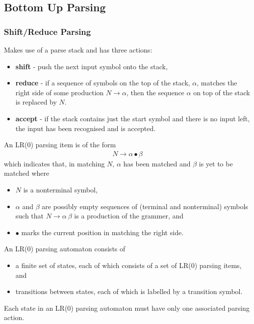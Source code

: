 \subsection{Bottom Up Parsing}

\subsubsection{Shift/Reduce Parsing}
Makes use of a parse stack and has three actions:
\begin{itemize}
    \item \textbf{shift} - push the next input symbol onto the stack,
    \item \textbf{reduce} - if a sequence of symbols on the top of the stack, $\alpha$, 
    matches the right side of some production $N \rightarrow \alpha$, then the sequence 
    $\alpha$ on top of the stack is replaced by $N$.
    \item \textbf{accept} - if the stack contains just the start symbol and there is no
    input left, the input has been recognised and is accepted.
\end{itemize}

An LR(0) parsing item is of the form
\begin{align*}
    N \rightarrow \alpha \bullet \beta
\end{align*}
which indicates that, in matching $N$, $\alpha$ has been matched and $\beta$ is yet to 
be matched where
\begin{itemize}
    \item $N$ is a nonterminal symbol,
    \item $\alpha$ and $\beta$ are possibly empty sequences of (terminal and nonterminal) 
    symbols such that $N \rightarrow \alpha\ \beta$ is a production of the grammer, and
    \item $\bullet$ marks the current position in matching the right side.
\end{itemize}

An LR(0) parsing automaton consists of
\begin{itemize}
    \item a finite set of states, each of which consists of a set of LR(0) parsing items, and
    \item transitions between states, each of which is labelled by a transition symbol.
\end{itemize}
Each state in an LR(0) parsing automaton must have only one associated parsing action.

